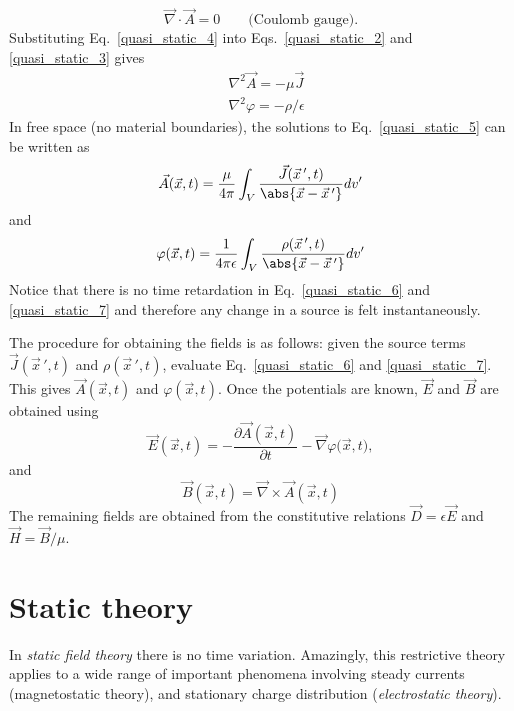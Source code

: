 \documentclass[12pt,a4paper,oneside]{book}
\begin{document}
\begin{onehalfspace}
\begin{equation}\label{quasi_static_4}
	\boxed{	\vec{\nabla}\cdot\vec{A}= 0\qquad\text{(Coulomb gauge).}}
\end{equation}
Substituting Eq.~\eqref{quasi_static_4} into Eqs.~\eqref{quasi_static_2} and \ref{quasi_static_3} gives
\begin{equation}\label{quasi_static_5}
\boxed{	\begin{aligned}
	&\nabla^2\vec{A} = -\mu\vec{J} \\[8pt]
	&\nabla^2\varphi = -\rho/\epsilon
	\end{aligned}}
\end{equation}
In free space (no material boundaries), the solutions to Eq.~\eqref{quasi_static_5} can be written as
\begin{equation}\label{quasi_static_6}
	\vec{A}(\vec{x},t)=\frac{\mu}{4\pi}\int_{V}\frac{\vec{J}(\vec{x}\,',t)}{\abs{\vec{x}- \vec{x}\,'}}dv'
\end{equation}
and
\begin{equation}\label{quasi_static_7}
	{\varphi}(\vec{x},t)=\frac{1}{4\pi\epsilon}\int_{V}\frac{\rho(\vec{x}\,',t)}{\abs{\vec{x}- \vec{x}\,'}}dv'
\end{equation}
Notice that there is no time retardation in Eq.~\eqref{quasi_static_6} and \ref{quasi_static_7} and therefore any change in a source is felt instantaneously.

The procedure for obtaining the fields is as follows: given the source terms $\vec{J}(\vec{x}\,',t)$ and $\rho(\vec{x}\,',t)$, evaluate Eq.~\eqref{quasi_static_6} and \ref{quasi_static_7}. This gives $\vec{A}(\vec{x},t)$ and ${\varphi}(\vec{x},t)$. Once the potentials are known, $\vec{E}$ and $\vec{B}$ are obtained using 
\begin{equation}\label{quasi_static_8}
	\vec{E}(\vec{x},t)= -\frac{\partial \vec{A}(\vec{x},t)}{\partial t} - \vec{\nabla}\varphi\big(\vec{x},t\big),
\end{equation}
and
\begin{equation}\label{quasi_static_9}
	\vec{B}(\vec{x},t)= \vec{\nabla}\times\vec{A}(\vec{x},t)
\end{equation}
The remaining fields are obtained from the constitutive relations $\vec{D}=\epsilon\vec{E}$ and $\vec{H}=\vec{B}/\mu$.

\section{Static theory}
In \textit{static field theory} there is no time variation. Amazingly, this restrictive theory applies to a wide range of important phenomena involving steady currents (magnetostatic theory), and stationary charge distribution (\textit{electrostatic theory}). 


\end{onehalfspace}
\end{document}

